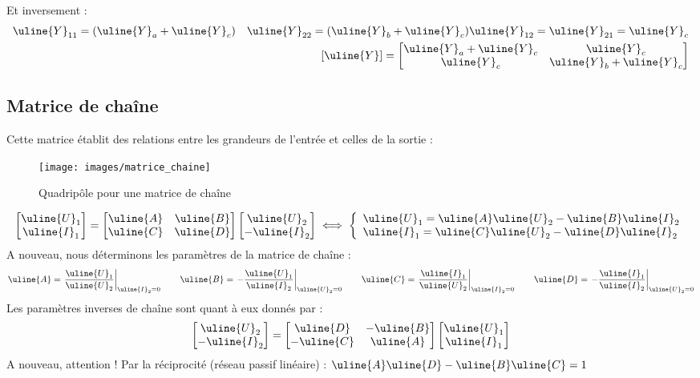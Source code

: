 \documentclass[12pt,a4paper]{article}
\newcommand{\uy}{\uline{Y} }
\newcommand{\ui}{\uline{I} }
\newcommand{\uu}{\uline{U} }
\newcommand{\ua}{\uline{A} }
\newcommand{\ub}{\uline{B} }
\newcommand{\uc}{\uline{C} }
\newcommand{\ud}{\uline{D} }
\begin{document}
Et inversement :
\begin{align}
	\uy_{11} = (\uy_a + \uy_c) \quad \uy_{22} = (\uy_b + \uy_c) \uy_{12} = \uy_{21} = \uy_c \\ 
	[\uy] = \begin{bmatrix}
		\uy_a + \uy_c & \uy_c\\
		\uy_c & \uy_b + \uy_c
	\end{bmatrix}
\end{align}
\subsection[Matrice de chaîne (transmission)]{Matrice de chaîne}
Cette matrice établit des relations entre les grandeurs de l'entrée et celles de la sortie :
\begin{figure}[!h]
	\centering
	\texttt{[image: images/matrice\_chaine]}
	\caption{Quadripôle pour une matrice de chaîne}
\end{figure}
\begin{equation}
	\begin{bmatrix}
	\uu_1\\
	\ui_1
	\end{bmatrix} = 
	\begin{bmatrix}
		\ua & \ub\\
		\uc & \ud
	\end{bmatrix} \begin{bmatrix}
	\uu_2\\
	-\ui_2
	\end{bmatrix} \iff \left\{\begin{array}{l}
\uu_1 = \ua\uu_2 - \ub\ui_2\\
\ui_1 = \uc\uu_2 - \ud\ui_2
\end{array}\right.
\label{equ: matrice chaine}
\end{equation}
A nouveau, nous déterminons les paramètres de la matrice de chaîne :
\begin{equation}
	\ua = \left.\frac{\uu_1}{\uu_2}\right|_{\ui_2 = 0} \qquad
	\ub = \left.-\frac{\uu_1}{\ui_2}\right|_{\uu_2 = 0} \qquad
	\uc = \left.\frac{\ui_1}{\uu_2}\right|_{\ui_2 = 0} \qquad
	\ud = \left.-\frac{\ui_1}{\ui_2}\right|_{\uu_2 = 0}
\end{equation}
Les paramètres inverses de chaîne sont quant à eux donnés par :
\begin{equation}
	\begin{bmatrix}
	\uu_2\\
	-\ui_2
	\end{bmatrix} = 
	\begin{bmatrix}
		\ud & -\ub\\
		-\uc & \ua
	\end{bmatrix} \begin{bmatrix}
	\uu_1\\
	\ui_1
	\end{bmatrix}
\end{equation}
A nouveau, attention ! Par la réciprocité (réseau passif linéaire) : $\ua\ud - \ub\uc = 1$
\end{document}
